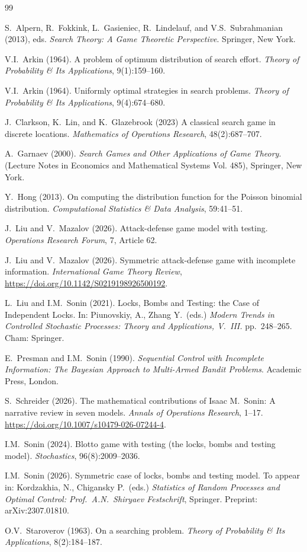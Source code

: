 \documentclass[a4paper,11pt]{article}
\begin{document}
\begin{thebibliography}{99}

 S.~Alpern, R.~Fokkink, L.~Gasieniec, R.~Lindelauf, and V.S.~Subrahmanian (2013), eds. {\em Search Theory: A Game Theoretic Perspective}. Springer, New York.

V.I.~Arkin (1964). A problem of optimum distribution of search effort. {\em Theory of Probability \& Its Applications}, 9(1):159--160.

V.I.~Arkin (1964). Uniformly optimal strategies in search problems. {\em Theory of Probability \& Its Applications}, 9(4):674--680.

 J.~Clarkson, K.~Lin, and  K.~Glazebrook (2023) A classical search game in discrete locations. {\em Mathematics of
Operations Research}, 48(2):687--707.

 A.~Garnaev (2000). \emph{Search Games and Other Applications of Game Theory}. (Lecture Notes in Economics and Mathematical Systems Vol. 485), Springer, New York.

Y.~Hong (2013). On computing the distribution function for the Poisson binomial distribution. {\em Computational Statistics \& Data Analysis}, 59:41--51.

J.~Liu and V.~Mazalov (2026). Attack-defense game model with testing. {\em Operations Research Forum}, 7, Article 62.

J.~Liu and V.~Mazalov (2026). Symmetric attack-defense game with incomplete information. {\em International Game Theory Review}, \url{https://doi.org/10.1142/S0219198926500192}.
		
L.~Liu and I.M.~Sonin (2021). Locks, Bombs and Testing: the Case of Independent Locks. In: Piunovskiy, A., Zhang Y.\ (eds.) \emph{Modern Trends in Controlled Stochastic Processes: Theory and Applications, V.\ III.} pp.\ 248--265. Cham: Springer.

E.~Presman and I.M.~Sonin (1990). {\em Sequential Control with Incomplete Information: The Bayesian Approach to Multi-Armed Bandit Problems}. Academic Press, London.

S.~Schreider (2026). The mathematical contributions of Isaac M.~Sonin: A narrative review in seven models. {\em Annals of Operations Research}, 1--17. \url{https://doi.org/10.1007/s10479-026-07244-4}.

 I.M.~Sonin (2024). Blotto game with testing (the locks, bombs and testing model). {\em Stochastics}, 96(8):2009--2036.

 I.M.~Sonin (2026). Symmetric case of locks, bombs and testing model. To appear in: Kordzakhia, N., Chigansky P.\ (eds.) \emph{Statistics of Random Processes and Optimal Control: Prof.~A.N.~Shiryaev Festschrift}, Springer. Preprint: arXiv:2307.01810.

O.V.~Staroverov (1963). On a searching problem. {\em Theory of Probability \& Its Applications}, 8(2):184--187.


\end{thebibliography}
\end{document}
